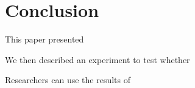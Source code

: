 \chapter{Conclusion}
\thispagestyle{empty}%
This paper presented

We then described an experiment to test whether

Researchers can use the results of